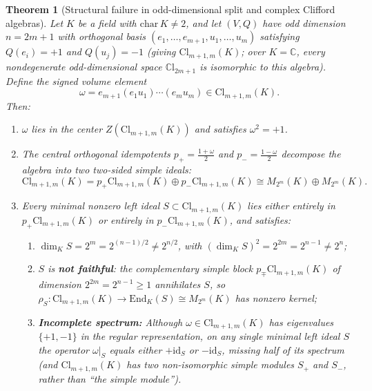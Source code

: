 \documentclass[11pt,a4paper]{article}
\theoremstyle{plain}
\newtheorem{theorem}{Theorem}[section]
\theoremstyle{definition}
\theoremstyle{remark}
\newcommand{\Cl}{\mathrm{Cl}}
\newcommand{\CCl}{\mathbb{C}\mathrm{l}}
\newcommand{\End}{\mathrm{End}}
\newcommand{\id}{\mathrm{id}}
\begin{document}
\begin{theorem}[Structural failure in odd-dimensional split and complex Clifford algebras]\label{thm:odd-split}
Let $K$ be a field with $\mathrm{char}\,K \neq 2$, and let $(V, Q)$ have odd dimension $n = 2m + 1$ with orthogonal basis $(e_1, \dots, e_{m+1}, u_1, \dots, u_m)$ satisfying $Q(e_i) = +1$ and $Q(u_j) = -1$ (giving $\Cl_{m+1,m}(K)$; over $K = \mathbb{C}$, every nondegenerate odd-dimensional space $\CCl_{2m+1}$ is isomorphic to this algebra). Define the signed volume element
\[
  \omega = e_{m+1} (e_1 u_1)\cdots(e_m u_m) \in \Cl_{m+1,m}(K).
\]
Then:
\begin{enumerate}
  \item $\omega$ lies in the center $Z(\Cl_{m+1,m}(K))$ and satisfies $\omega^2 = +1$.
  \item The central orthogonal idempotents $p_+ = \frac{1 + \omega}{2}$ and $p_- = \frac{1 - \omega}{2}$ decompose the algebra into two two-sided simple ideals:
  \[
    \Cl_{m+1,m}(K) = p_+ \Cl_{m+1,m}(K) \oplus p_- \Cl_{m+1,m}(K) \cong M_{2^m}(K) \oplus M_{2^m}(K).
  \]
  \item Every minimal nonzero left ideal $S \subset \Cl_{m+1,m}(K)$ lies either entirely in $p_+ \Cl_{m+1,m}(K)$ or entirely in $p_- \Cl_{m+1,m}(K)$, and satisfies:
  \begin{enumerate}
    \item $\dim_K S = 2^m = 2^{(n-1)/2} \neq 2^{n/2}$, with $(\dim_K S)^2 = 2^{2m} = 2^{n-1} \neq 2^n$;
    \item $S$ is \textbf{not faithful}: the complementary simple block $p_\mp \Cl_{m+1,m}(K)$ of dimension $2^{2m} = 2^{n-1} \ge 1$ annihilates $S$, so $\rho_S : \Cl_{m+1,m}(K) \to \End_K(S) \cong M_{2^m}(K)$ has nonzero kernel;
    \item \textbf{Incomplete spectrum:} Although $\omega \in \Cl_{m+1,m}(K)$ has eigenvalues $\{+1, -1\}$ in the regular representation, on any single minimal left ideal $S$ the operator $\omega|_S$ equals either $+\id_S$ or $-\id_S$, missing half of its spectrum (and $\Cl_{m+1,m}(K)$ has \emph{two} non-isomorphic simple modules $S_+$ and $S_-$, rather than ``the simple module'').
  \end{enumerate}
\end{enumerate}
\end{theorem}
\end{document}
